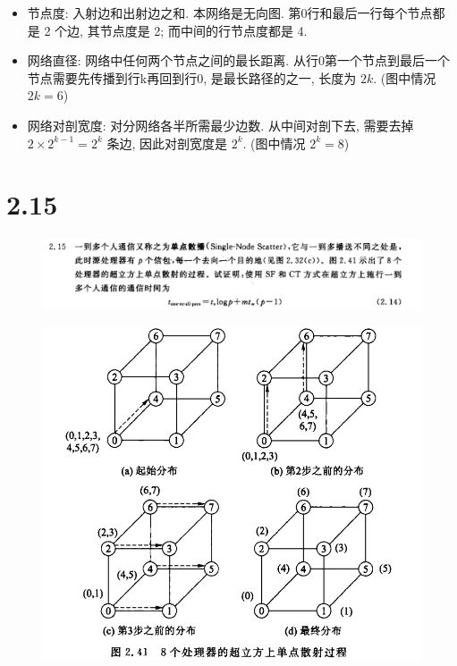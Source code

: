 \documentclass[UTF8]{article}
\begin{document}
\begin{itemize}
\item 节点度: 入射边和出射边之和. 本网络是无向图. 第0行和最后一行每个节点都是 2 个边, 其节点度是 2; 而中间的行节点度都是 4.
\item 网络直径: 网络中任何两个节点之间的最长距离. 从行0第一个节点到最后一个节点需要先传播到行k再回到行0, 是最长路径的之一, 长度为 $2k$. (图中情况 $2k=6$)
\item 网络对剖宽度: 对分网络各半所需最少边数. 从中间对剖下去, 需要去掉 $2\times 2^{k-1}=2^k$ 条边, 因此对剖宽度是 $2^k$. (图中情况 $2^k=8$)
\end{itemize}

\section*{2.15}
\begin{center}
\begin{figure}[H]
	\centering
	\includegraphics[width=\linewidth]{image/2.15.png}
\end{figure}
\end{center}
\begin{center}
\begin{figure}[H]
	\centering
	\includegraphics[width=\linewidth*2/3]{image/2.15.image.png}
\end{figure}
\end{center}
\end{document}
